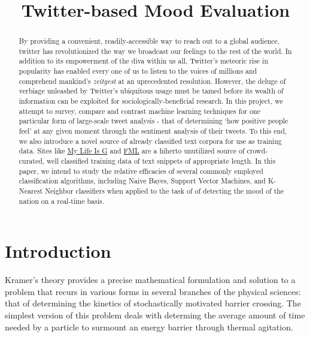 \documentclass[conference]{IEEETrans/IEEEtran}
\begin{document}
 
\title{Twitter-based Mood Evaluation}
\author{
    \and
}
\maketitle

\begin{abstract}
    By providing a convenient, readily-accessible way to reach out to a global audience, twitter has revolutionized the way we broadcast our feelings to the rest of the world. In addition to its empowerment of the diva within us all, Twitter's meteoric rise in popularity has enabled every one of us to listen to the voices of millions and comprehend mankind's \textit{zeitgest} at an uprecedented resolution. However, the deluge of verbiage unleashed by Twitter's ubiquitous usage must be tamed before its wealth of information can be exploited for sociologically-beneficial research. In this project, we attempt to survey, compare and contrast machine learning techniques for one particular form of large-scale tweet analysis - that of determining `how positive people feel' at any given moment through the sentiment analysis of their tweets. To this end, we also introduce a novel source of already classified text corpora for use as training data. Sites like \href{http://mylifeisg.com}{My Life Is G} and \href{http://fmylife.com}{FML} are a hiherto unutilized source of crowd-curated, well classified training data of text snippets of appropriate length. In this paper, we intend to study the relative efficacies of several commonly employed classification algorithms, including Naive Bayes, Support Vector Machines, and K-Nearest Neighbor classifiers when applied to the task of of detecting the mood of the nation on a real-time basis.
\end{abstract}

\section{Introduction}
Kramer's theory provides a precise mathematical formulation and solution to a
problem that recurs in various forms in several branches of the physical
sciences: that of determining the kinetics of stochastically motivated barrier
crossing. The simplest version of this problem deals with determing the average
amount of time needed by a particle to surmount an energy barrier through
thermal agitation.
\end{document}
